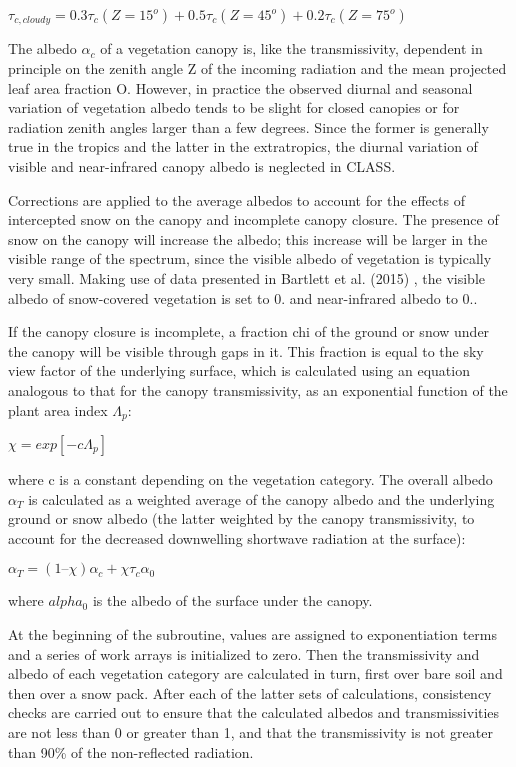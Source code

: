 $\tau_{c,cloudy} = 0.3 \tau_c(Z=15^o) + 0.5 \tau_c(Z=45^o) + 0.2 \tau_c(Z=75^o)$

The albedo $\alpha_c$ of a vegetation canopy is, like the transmissivity, dependent in principle on the zenith angle Z of the incoming radiation and the mean projected leaf area fraction O. However, in practice the observed diurnal and seasonal variation of vegetation albedo tends to be slight for closed canopies or for radiation zenith angles larger than a few degrees. Since the former is generally true in the tropics and the latter in the extratropics, the diurnal variation of visible and near-\/infrared canopy albedo is neglected in C\+L\+A\+S\+S.

Corrections are applied to the average albedos to account for the effects of intercepted snow on the canopy and incomplete canopy closure. The presence of snow on the canopy will increase the albedo; this increase will be larger in the visible range of the spectrum, since the visible albedo of vegetation is typically very small. Making use of data presented in Bartlett et al. (2015) \cite{Bartlett2015-gw}, the visible albedo of snow-\/covered vegetation is set to 0. and near-\/infrared albedo to 0..

If the canopy closure is incomplete, a fraction chi of the ground or snow under the canopy will be visible through gaps in it. This fraction is equal to the sky view factor of the underlying surface, which is calculated using an equation analogous to that for the canopy transmissivity, as an exponential function of the plant area index $\Lambda_p$\+:

$\chi = exp[-c\Lambda_p]$

where c is a constant depending on the vegetation category. The overall albedo $\alpha_T$ is calculated as a weighted average of the canopy albedo and the underlying ground or snow albedo (the latter weighted by the canopy transmissivity, to account for the decreased downwelling shortwave radiation at the surface)\+:

$\alpha_T = (1 – \chi) \alpha_c + \chi \tau_c \alpha_0$

where $alpha_0$ is the albedo of the surface under the canopy.

At the beginning of the subroutine, values are assigned to exponentiation terms and a series of work arrays is initialized to zero. Then the transmissivity and albedo of each vegetation category are calculated in turn, first over bare soil and then over a snow pack. After each of the latter sets of calculations, consistency checks are carried out to ensure that the calculated albedos and transmissivities are not less than 0 or greater than 1, and that the transmissivity is not greater than 90\% of the non-\/reflected radiation.

